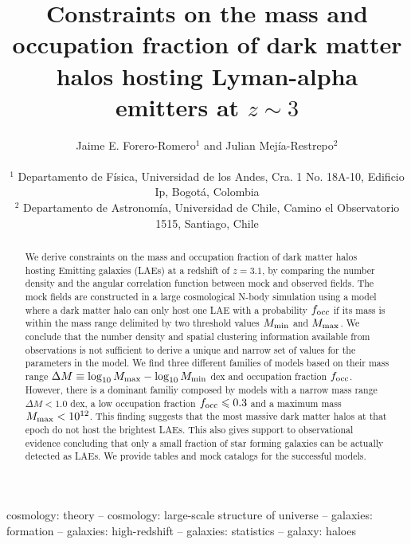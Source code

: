 \documentclass[usenatbib]{mn2e}
\newcommand{\ly}{{\ifmmode{{\rm Ly}\alpha}\else{Ly$\alpha$~}\fi}}
\newcommand{\hMsun}{{\ifmmode{h^{-1}{\rm
        {M_{\odot}}}}\else{$h^{-1}{\rm{M_{\odot}}}$}\fi}}
\begin{document}
\title[Halo mass and occupation fraction for LAEs at
  $z=3.1$]{Constraints on the mass and occupation
  fraction of dark matter halos hosting Lyman-alpha emitters
  at $z\sim 3$}    
\author[~J.~E. Forero-Romero and J. Mejia]{
\parbox[t]{\textwidth}{\raggedright 
Jaime E. Forero-Romero$^{1}$ and
Julian Mej\'ia-Restrepo$^{2}$ 
}
\vspace*{6pt}\\
$^{1}$ Departamento de F\'{i}sica, Universidad de los Andes, Cra. 1
No. 18A-10, Edificio Ip, Bogot\'a, Colombia \\
$^{2}$ Departamento de Astronom\'{i}a, Universidad de Chile, Camino el
Observatorio 1515, Santiago, Chile} 

\maketitle

\begin{abstract}
%
We derive constraints on the mass and occupation fraction of dark
matter halos hosting \ly Emitting galaxies (LAEs) at a redshift of
$z=3.1$, by comparing the number density and the angular
correlation function between mock and observed fields. The mock fields
are constructed in a large cosmological N-body simulation using a
model where a dark matter halo can only host one LAE with a
probability $f_{\rm occ}$ if its mass is within the mass range
delimited by two threshold values  $M_{\rm min}$ and $M_{\rm max}$. We
conclude that the number density and spatial clustering information
available from observations is not sufficient to derive a unique and narrow set of
values for the parameters in the model. We find three different
families of models based on their mass range $\Delta M \equiv
\log_{10}M_{\rm max} - \log_{10} M_{\rm min}$ dex and occupation
fraction $f_{\rm occ}$.  However, there is a dominant familiy composed
by models with a narrow mass range $\Delta M<1.0$ dex, a low
occupation fraction $f_{\rm occ}\leq 0.3$ and a maximum mass $M_{\rm
  max}< 10^{12}$\hMsun.  This finding suggests that the most massive
dark matter halos at that epoch do not host the brightest LAEs. This
also gives support to observational evidence concluding that only a
small fraction of star forming galaxies can be actually detected as
LAEs. We provide tables and mock catalogs for the successful models. 
\end{abstract}

\begin{keywords}
{cosmology: theory – cosmology: large-scale structure of universe –
  galaxies: formation – galaxies: high-redshift – galaxies: statistics
  – galaxy: haloes} 
\end{keywords}
\end{document}
